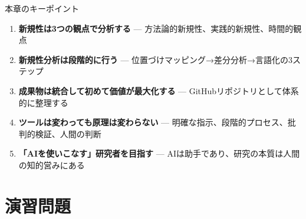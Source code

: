 \vspace{5mm}
\begin{itembox}[l]{本章のキーポイント}
\begin{enumerate}
\item \textbf{新規性は3つの観点で分析する} --- 方法論的新規性、実践的新規性、時間的観点
\item \textbf{新規性分析は段階的に行う} --- 位置づけマッピング→差分分析→言語化の3ステップ
\item \textbf{成果物は統合して初めて価値が最大化する} --- GitHubリポジトリとして体系的に整理する
\item \textbf{ツールは変わっても原理は変わらない} --- 明確な指示、段階的プロセス、批判的検証、人間の判断
\item \textbf{「AIを使いこなす」研究者を目指す} --- AIは助手であり、研究の本質は人間の知的営みにある
\end{enumerate}
\end{itembox}

\section*{演習問題}

